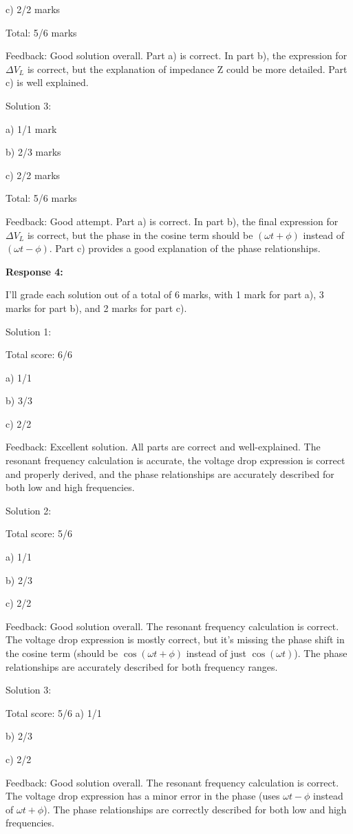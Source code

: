 \documentclass[a4paper,11pt]{article}
\begin{document}
c) 2/2 marks

Total: 5/6 marks

Feedback: Good solution overall. Part a) is correct. In part b), the expression for \(\Delta V_L \) is correct, but the explanation of impedance Z could be more detailed. Part c) is well explained.

Solution 3:

a) 1/1 mark

b) 2/3 marks

c) 2/2 marks

Total: 5/6 marks

Feedback: Good attempt. Part a) is correct. In part b), the final expression for \(\Delta V_L \) is correct, but the phase in the cosine term should be \((\omega t + \phi)\) instead of \((\omega t - \phi)\). Part c) provides a good explanation of the phase relationships.

\bigskip
\textbf{Response 4:}

I'll grade each solution out of a total of 6 marks, with 1 mark for part a), 3 marks for part b), and 2 marks for part c).

Solution 1:

Total score: 6/6

a) 1/1

b) 3/3

c) 2/2

Feedback: Excellent solution. All parts are correct and well-explained. The resonant frequency calculation is accurate, the voltage drop expression is correct and properly derived, and the phase relationships are accurately described for both low and high frequencies.

Solution 2:

Total score: 5/6

a) 1/1

b) 2/3

c) 2/2

Feedback: Good solution overall. The resonant frequency calculation is correct. The voltage drop expression is mostly correct, but it's missing the phase shift in the cosine term (should be \(\cos(\omega t + \phi)\) instead of just \(\cos(\omega t)\)). The phase relationships are accurately described for both frequency ranges.

Solution 3:

Total score: 5/6
a) 1/1

b) 2/3

c) 2/2

Feedback: Good solution overall. The resonant frequency calculation is correct. The voltage drop expression has a minor error in the phase (uses \(\omega t - \phi\) instead of \(\omega t + \phi\)). The phase relationships are correctly described for both low and high frequencies.
\end{document}
